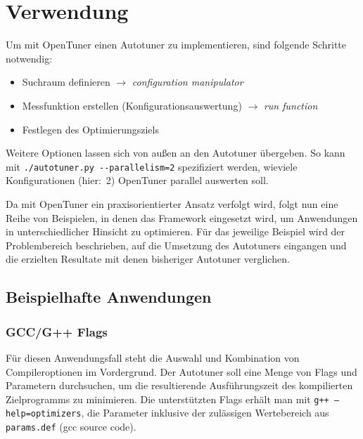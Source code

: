 \documentclass[a4paper,11pt]{scrartcl}
\begin{document}
\section{Verwendung}
Um mit OpenTuner einen Autotuner zu implementieren, sind folgende Schritte notwendig:
\begin{itemize}
  \item Suchraum definieren $\rightarrow$ \emph{configuration manipulator}
  \item Messfunktion erstellen (Konfigurationsauswertung) $\rightarrow$ \emph{run function}
  \item Festlegen des Optimierungsziels
\end{itemize}
Weitere Optionen lassen sich von außen an den Autotuner übergeben. So kann 
mit \texttt{./autotuner.py -{}-parallelism=2} spezifiziert werden, wieviele Konfigurationen
(hier:~2) OpenTuner parallel auswerten soll. \newline

Da mit OpenTuner ein praxisorientierter Ansatz verfolgt wird, folgt nun eine Reihe von
Beispielen, in denen das Framework eingesetzt wird, um Anwendungen in unterschiedlicher 
Hinsicht zu optimieren. Für das jeweilige Beispiel wird der Problembereich beschrieben,
auf die Umsetzung des Autotuners eingangen und die erzielten Resultate mit denen bisheriger
Autotuner verglichen.

\subsection{Beispielhafte Anwendungen}
\subsubsection{GCC/G++ Flags}
Für diesen Anwendungsfall steht die Auswahl und Kombination von Compileroptionen
im Vordergrund. Der Autotuner soll eine Menge von Flags und Parametern durchsuchen,
um die resultierende Ausführungszeit des kompilierten Zielprogramms zu minimieren.
Die unterstützten Flags erhält man mit \texttt{g++ --help=optimizers}, die 
Parameter inklusive der zulässigen Wertebereich aus \texttt{params.def} (gcc source code). \newline
\end{document}
